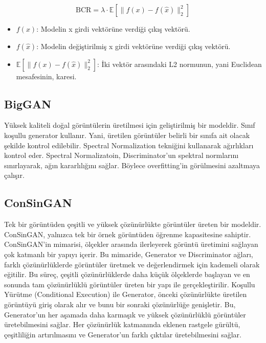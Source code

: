 \[ \text{BCR} = \lambda \cdot \mathbb{E}\left[\|f(x) - f(\hat{x})\|_2^2\right] \]

\begin{itemize}
    \item $f(x)$: Modelin x girdi vektörüne verdiği çıkış vektörü.
    \item $f(\hat{x})$: Modelin değiştirilmiş x girdi vektörüne verdiği çıkış vektörü.
    \item $\mathbb{E}\left[\|f(x) - f(\hat{x})\|_2^2\right]$: İki vektör arasındaki L2 normunun, yani Euclidean mesafesinin, karesi.
\end{itemize}

\newpage

\subsection{BigGAN}

Yüksek kaliteli doğal görüntülerin üretilmesi için geliştirilmiş bir modeldir. Sınıf koşullu generator kullanır. Yani, üretilen görüntüler belirli bir sınıfa ait olacak şekilde kontrol edilebilir. Spectral Normalization tekniğini kullanarak ağırlıkları kontrol eder. Spectral Normalizatoin, Discriminator'un spektral normlarını sınırlayarak, ağın kararlılığını sağlar. Böylece overfitting'in görülmesini azaltmaya çalışır.

\newpage

\subsection{ConSinGAN}

Tek bir görüntüden çeşitli ve yüksek çözünürlükte görüntüler üreten bir modeldir. ConSinGAN, yalnızca tek bir örnek görüntüden öğrenme kapasitesine sahiptir. ConSinGAN’in mimarisi, ölçekler arasında ilerleyerek görüntü üretimini sağlayan çok katmanlı bir yapıyı içerir. Bu mimaride, Generator ve Discriminator ağları, farklı çözünürlüklerde görüntüler üretmek ve değerlendirmek için kademeli olarak eğitilir. Bu süreç, çeşitli çözünürlüklerde daha küçük ölçeklerde başlayan ve en sonunda tam çözünürlüklü görüntüler üreten bir yapı ile gerçekleştirilir. Koşullu Yürütme (Conditional Execution) ile Generator, önceki çözünürlükte üretilen görüntüyü giriş olarak alır ve bunu bir sonraki çözünürlüğe genişletir. Bu, Generator'un her aşamada daha karmaşık ve yüksek çözünürlüklü görüntüler üretebilmesini sağlar. Her çözünürlük katmanında eklenen rastgele gürültü, çeşitliliğin artırılmasını ve Generator'un farklı çıktılar üretebilmesini sağlar.

